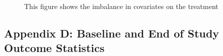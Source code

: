 \documentclass[
  single column]{article}
\begin{document}
\begin{figure}


\caption{\label{fig-match_1}This figure shows the imbalance in
covariates on the treatment}

\end{figure}%

\subsection{Appendix D: Baseline and End of Study Outcome
Statistics}\label{appendix-outcomes}
\end{document}
